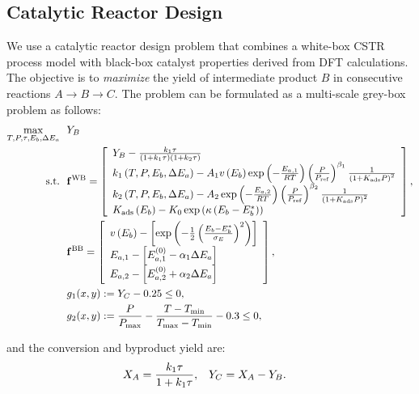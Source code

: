 \documentclass[12pt,a4paper]{article}%
\theoremstyle{plain}%
\theoremstyle{remark}%
\theoremstyle{definition}%
\def\WB{\mathrm{WB}}
\def\BB{\mathrm{BB}}
\newcommand{\bff}{{\bf f}}
\begin{document}
\begin{appendices}
\subsection{Catalytic Reactor Design}\label{subsec:app_cstr}
We use a catalytic reactor design problem that combines a white-box CSTR process model with black-box catalyst properties derived from DFT calculations. The objective is to \emph{maximize} the yield of intermediate product $B$ in consecutive reactions $A \to B \to C$. The problem can be formulated as a multi-scale grey-box problem as follows:
\begin{align} \label{eq:CSTR}
    \max_{T, P, \tau, E_b, \Delta E_a} &~~ Y_B \\\notag
    \text{s.t.} &~~ \bff^\WB=\left[
        \begin{array}{l}
            Y_B-\frac{k_1 \tau}{\left(1+k_1 \tau\right)\left(1+k_2 \tau\right)} \\
            k_1\left(T, P, E_b, \Delta E_a\right)-A_1 v\left(E_b\right) \exp \left(-\frac{E_{a, 1}}{R T}\right)\left(\frac{P}{P_{\mathrm{ref}}}\right)^{\beta_1} \frac{1}{\left(1+K_{\mathrm{ads}} P\right)^2} \\
            k_2\left(T, P, E_b, \Delta E_a\right)-A_2 \exp \left(-\frac{E_{a, 2}}{R T}\right)\left(\frac{P}{P_{\mathrm{ref}}}\right)^{\beta_2} \frac{1}{\left(1+K_{\mathrm{ads}} P\right)^2} \\
            K_{\mathrm{ads}}\left(E_b\right) - K_0 \exp\left(\kappa \left(E_b - E_b^*\right)\right)
        \end{array}\right], \\\notag
    &~~ \bff^\BB=\left[
        \begin{array}{l}
            v\left(E_b\right)-\left[\exp \left(-\frac{1}{2}\left(\frac{E_b-E_b^*}{\sigma_E}\right)^2\right)\right] \\
            E_{a, 1}-\left[E_{a, 1}^{(0)}-\alpha_1 \Delta E_a\right] \\
            E_{a, 2}-\left[E_{a, 2}^{(0)}+\alpha_2 \Delta E_a\right]
        \end{array}\right], \\\notag
    &~~ g_1(x, y) := Y_C - 0.25 \leq 0, \\\notag
    &~~ g_2(x, y) := \frac{P}{P_{\max}} - \frac{T - T_{\min}}{T_{\max} - T_{\min}} - 0.3 \leq 0,
\end{align}

and the conversion and byproduct yield are:
\begin{align}\notag
    X_A &= \frac{k_1 \tau}{1 + k_1 \tau}, & Y_C &= X_A - Y_B.
\end{align}


\end{appendices}
\end{document}
